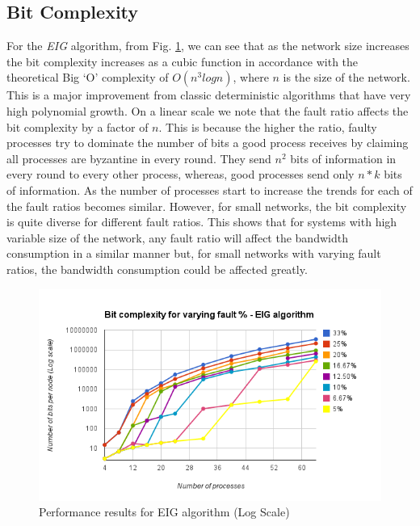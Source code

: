 \subsection{Bit Complexity}
For the \textit{EIG} algorithm, from Fig. \ref{fig:eig}, we can see that as the network size increases the bit complexity increases as a cubic function in accordance with the theoretical Big `O' complexity of $O(n^3 logn)$, where $n$ is the size of the network. This is a major improvement from classic deterministic algorithms that have very high polynomial growth. On a linear scale we note that the fault ratio affects the bit complexity by a factor of $n$. This is because the higher the ratio, faulty processes try to dominate the number of bits a good process receives by claiming all processes are byzantine in every round. They send $n^2$ bits of information in every round to every other process, whereas, good processes send only $n*k$ bits of information. As the number of processes start to increase the trends for each of the fault ratios becomes similar. However, for small networks, the bit complexity is quite diverse for different fault ratios. This shows that for systems with high variable size of the network, any fault ratio will affect the bandwidth consumption in a similar manner but, for small networks with varying fault ratios, the bandwidth consumption could be affected greatly.   
\begin{figure}[ht]
 \centering
\includegraphics[scale=0.4]{eig}
\caption{Performance results for EIG algorithm (Log Scale)}
 \label{fig:eig}
\vspace{-2mm}
\end{figure}

